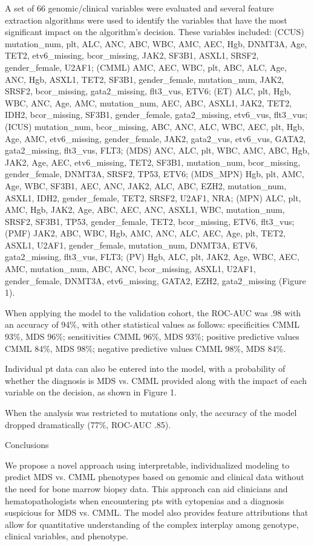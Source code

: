 A set of 66 genomic/clinical variables were evaluated and several feature extraction algorithms were used to identify the variables that have the most significant impact on the algorithm's decision. These variables included: (CCUS) mutation_num, plt, ALC, ANC, ABC, WBC, AMC, AEC, Hgb, DNMT3A, Age, TET2, etv6_missing, bcor_missing, JAK2, SF3B1, ASXL1, SRSF2, gender_female, U2AF1; (CMML) AMC, AEC, WBC, plt, ABC, ALC, Age, ANC, Hgb, ASXL1, TET2, SF3B1, gender_female, mutation_num, JAK2, SRSF2, bcor_missing, gata2_missing, flt3_vus, ETV6; (ET) ALC, plt, Hgb, WBC, ANC, Age, AMC, mutation_num, AEC, ABC, ASXL1, JAK2, TET2, IDH2, bcor_missing, SF3B1, gender_female, gata2_missing, etv6_vus, flt3_vus; (ICUS) mutation_num, bcor_missing, ABC, ANC, ALC, WBC, AEC, plt, Hgb, Age, AMC, etv6_missing, gender_female, JAK2, gata2_vus, etv6_vus, GATA2, gata2_missing, flt3_vus, FLT3; (MDS) ANC, ALC, plt, WBC, AMC, ABC, Hgb, JAK2, Age, AEC, etv6_missing, TET2, SF3B1, mutation_num, bcor_missing, gender_female, DNMT3A, SRSF2, TP53, ETV6; (MDS_MPN) Hgb, plt, AMC, Age, WBC, SF3B1, AEC, ANC, JAK2, ALC, ABC, EZH2, mutation_num, ASXL1, IDH2, gender_female, TET2, SRSF2, U2AF1, NRA; (MPN) ALC, plt, AMC, Hgb, JAK2, Age, ABC, AEC, ANC, ASXL1, WBC, mutation_num, SRSF2, SF3B1, TP53, gender_female, TET2, bcor_missing, ETV6, flt3_vus; (PMF) JAK2, ABC, WBC, Hgb, AMC, ANC, ALC, AEC, Age, plt, TET2, ASXL1, U2AF1, gender_female, mutation_num, DNMT3A, ETV6, gata2_missing, flt3_vus, FLT3; (PV) Hgb, ALC, plt, JAK2, Age, WBC, AEC, AMC, mutation_num, ABC, ANC, bcor_missing, ASXL1, U2AF1, gender_female, DNMT3A, etv6_missing, GATA2, EZH2, gata2_missing (Figure 1).

When applying the model to the validation cohort, the ROC-AUC was .98 with an accuracy of 94\%, with other statistical values as follows: specificities CMML 93\%, MDS 96\%; sensitivities CMML 96\%, MDS 93\%; positive predictive values CMML 84\%, MDS 98\%; negative predictive values CMML 98\%, MDS 84\%.

Individual pt data can also be entered into the model, with a probability of whether the diagnosis is MDS vs. CMML provided along with the impact of each variable on the decision, as shown in Figure 1.

When the analysis was restricted to mutations only, the accuracy of the model dropped dramatically (77\%, ROC-AUC .85).


Conclusions

We propose a novel approach using interpretable, individualized modeling to predict MDS vs. CMML phenotypes based on genomic and clinical data without the need for bone marrow biopsy data. This approach can aid clinicians and hematopathologists when encountering pts with cytopenias and a diagnosis suspicious for MDS vs. CMML. The model also provides feature attributions that allow for quantitative understanding of the complex interplay among genotype, clinical variables, and phenotype.


